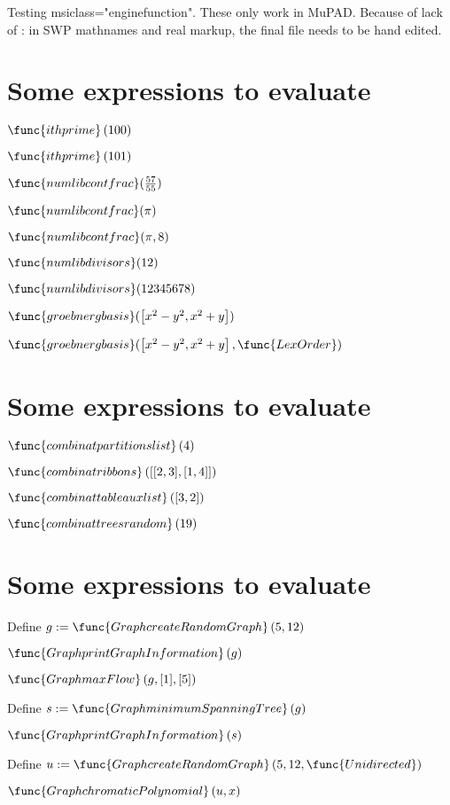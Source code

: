 \documentclass{article}
\begin{document}
Testing msiclass="enginefunction". These only work in MuPAD. Because of lack
of : in SWP mathnames and real markup, the final file needs to be hand
edited.

\section{Some expressions to evaluate}

$\func{ithprime}\left( 100\right) $

$\func{ithprime}\left( 101\right) $

$\func{numlibcontfrac}(\frac{57}{55})$

$\func{numlibcontfrac}(\pi )$

$\func{numlibcontfrac}(\pi ,8)$

$\func{numlibdivisors}(12)$

$\func{numlibdivisors}(12345678)$

$\func{groebnergbasis}(\left[ x^{2}-y^{2},x^{2}+y\right] )$

$\func{groebnergbasis}(\left[ x^{2}-y^{2},x^{2}+y\right] ,\func{LexOrder})$

\section{Some expressions to evaluate}

$\func{combinatpartitionslist}\left( 4\right) $

$\func{combinatribbons}\left( \left[ [2,3],[1,4]\right] \right) $

$\func{combinattableauxlist}\left( [3,2]\right) $

$\func{combinattreesrandom}\left( 19\right) $

\section{Some expressions to evaluate}

Define $g:=\func{GraphcreateRandomGraph}\left( 5,12\right) $

$\func{GraphprintGraphInformation}\left( g\right) $

$\func{GraphmaxFlow}\left( g,[1],[5]\right) $

Define $s:=\func{GraphminimumSpanningTree}\left( g\right) $

$\func{GraphprintGraphInformation}\left( s\right) $

Define $u:=\func{GraphcreateRandomGraph}\left( 5,12,\func{Unidirected}%
\right) $

$\func{GraphchromaticPolynomial}\left( u,x\right) $
\end{document}
